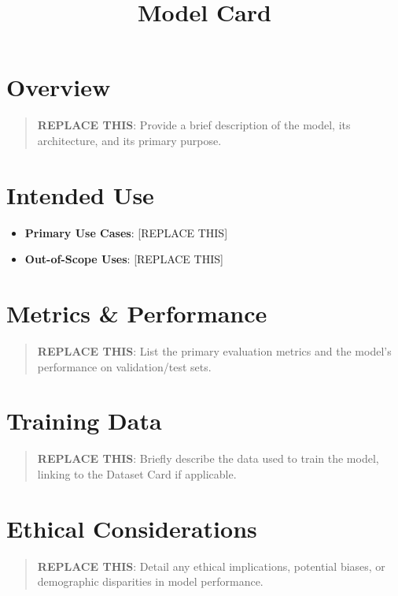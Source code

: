 \documentclass[
]{report}
\title{Model Card}
\author{}
\date{}
\providecommand{\tightlist}{%
  \setlength{\itemsep}{0pt}\setlength{\parskip}{0pt}}
\renewcommand*\contentsname{Table of contents}
\newcommand\contentsname{Table of contents}
\begin{document}
\maketitle

\renewcommand*\contentsname{Table of contents}
{
\hypersetup{linkcolor=}
\setcounter{tocdepth}{2}
\tableofcontents
}

\chapter{Overview}\label{overview}

\begin{quote}
\textbf{REPLACE THIS}: Provide a brief description of the model, its
architecture, and its primary purpose.
\end{quote}

\chapter{Intended Use}\label{intended-use}

\begin{itemize}
\tightlist
\item
  \textbf{Primary Use Cases}: {[}REPLACE THIS{]}
\item
  \textbf{Out-of-Scope Uses}: {[}REPLACE THIS{]}
\end{itemize}

\chapter{Metrics \& Performance}\label{metrics-performance}

\begin{quote}
\textbf{REPLACE THIS}: List the primary evaluation metrics and the
model's performance on validation/test sets.
\end{quote}

\chapter{Training Data}\label{training-data}

\begin{quote}
\textbf{REPLACE THIS}: Briefly describe the data used to train the
model, linking to the Dataset Card if applicable.
\end{quote}

\chapter{Ethical Considerations}\label{ethical-considerations}

\begin{quote}
\textbf{REPLACE THIS}: Detail any ethical implications, potential
biases, or demographic disparities in model performance.
\end{quote}
\end{document}
